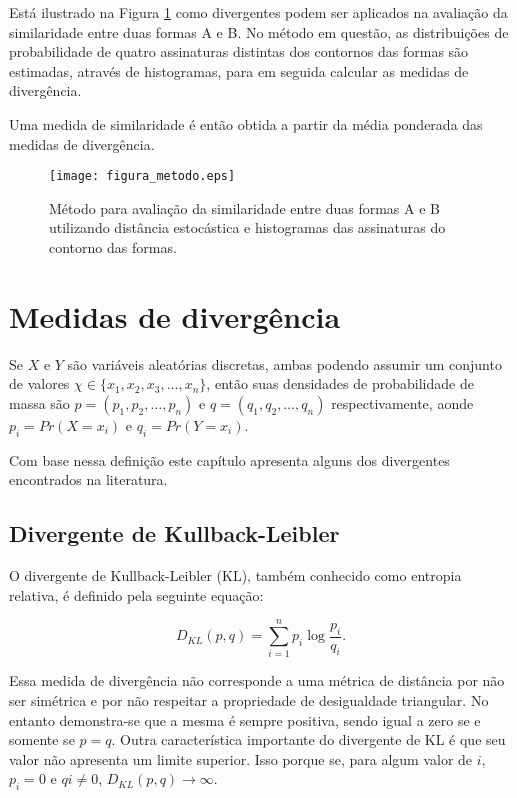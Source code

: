 Está ilustrado na  Figura \ref{fig:metodo_distancia} como divergentes podem ser aplicados na avaliação da similaridade entre duas formas A e B. No método em questão, as distribuições de probabilidade de quatro assinaturas distintas dos contornos das formas são estimadas, através de histogramas, para em seguida calcular as medidas de divergência. 

Uma medida de similaridade é então obtida  a partir da média ponderada das medidas de divergência.

\begin{figure}[h!]
  \caption{\label{fig:metodo_distancia} Método para avaliação da similaridade entre duas formas A e B utilizando distância estocástica e histogramas das assinaturas do contorno das formas.}
  \centering
  \texttt{[image: figura\_metodo.eps]}
\end{figure}


\section{Medidas de divergência}

Se $X\text{ e }Y$ são variáveis aleatórias discretas, ambas podendo assumir um conjunto de valores $\chi \in \{x_{1},x_{2},x_{3},\ldots,x_{n}\}$, então suas densidades de probabilidade de massa são $p = (p_{1},p_{2},\ldots,p_{n})$ e $q = (q_{1},q_{2},\ldots,q_{n})$ respectivamente, aonde $p_i = Pr(X = x_{i})$ e $q_i = Pr(Y = x_{i})$.    

Com base nessa definição este capítulo apresenta alguns dos divergentes encontrados na literatura. 

\subsection{Divergente de Kullback-Leibler}
O divergente de Kullback-Leibler (KL), também conhecido como entropia relativa, é definido pela seguinte equação:

\begin{equation} \label{eq:kl}
D_{KL}(p,q) = \sum\limits_{i = 1}^{n} p_{i}\log{\frac{p_{i}}{q_{i}}}\text{.}
\end{equation}

Essa medida de divergência não corresponde a uma métrica de distância por não ser simétrica e por não respeitar a propriedade de desigualdade triangular. No entanto demonstra-se que a mesma é sempre positiva, sendo igual a zero se e somente se $p = q$. Outra característica importante do divergente de KL é que seu valor não apresenta um limite superior. Isso porque se, para algum valor de $i$, $p_{i} = 0$ e $q{i} \neq 0$, $D_{KL}(p,q) \to \infty$.

